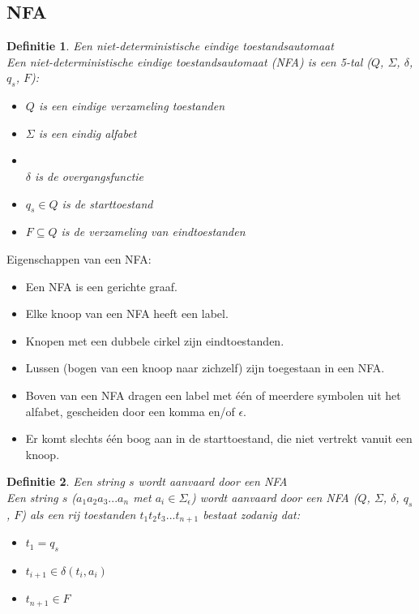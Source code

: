 \documentclass[a4paper]{article}
\newtheorem{tdefinitie}{Definitie}[section]
\newenvironment{definitie}[1]%
  {\begin{mdframed}[backgroundcolor=silver,
    topline=false,
    rightline=false,
    leftline=false,
    bottomline=false]\begin{tdefinitie}#1\\\normalfont}%
  {\end{tdefinitie}\end{mdframed}}
\newcommand{\powerset}{\ensuremath{\mathcal{P}}}
\begin{document}

\subsection{NFA}

\begin{definitie}{Een niet-deterministische eindige toestandsautomaat}
  Een niet-deterministische eindige toestandsautomaat (NFA) is een 5-tal ($Q$, $\Sigma$, $\delta$, $q_s$, $F$):
  \begin{itemize}
  \item $Q$ is een eindige verzameling toestanden
  \item $\Sigma$ is een eindig alfabet
  \item \bm{$\delta : Q \times \Sigma_\epsilon \rightarrow \powerset(Q)$}\\$\delta$ is de overgangsfunctie
  \item $q_s \in Q$ is de starttoestand
  \item $F \subseteq Q$ is de verzameling van eindtoestanden
  \end{itemize}
\end{definitie}

Eigenschappen van een NFA:
\begin{itemize}
\item Een NFA is een gerichte graaf.
\item Elke knoop van een NFA heeft een label.
\item Knopen met een dubbele cirkel zijn eindtoestanden.
\item Lussen (bogen van een knoop naar zichzelf) zijn toegestaan in een NFA.
\item Boven van een NFA dragen een label met \'e\'en of meerdere symbolen uit het alfabet, gescheiden door een komma en/of $\epsilon$.
\item Er komt slechts \'e\'en boog aan in de starttoestand, die niet vertrekt vanuit een knoop.
\end{itemize}


\begin{definitie}{Een string $s$ wordt aanvaard door een NFA}
  Een string $s$ ($a_1a_2a_3...a_n$ met $a_i \in \Sigma_\epsilon$) wordt aanvaard door een NFA ($Q$, $\Sigma$, $\delta$, $q_s$, $F$) als een rij toestanden $t_1t_2t_3...t_{n+1}$ bestaat zodanig dat:
  \begin{itemize}
  \item $t_1 = q_s$
  \item $t_{i+1} \in \delta(t_i, a_i)$
  \item $t_{n+1} \in F$
  \end{itemize}
\end{definitie}
\end{document}
